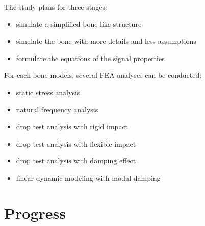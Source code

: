 \documentclass{sigchi}
\begin{document}
The study plans for three stages:
\begin{itemize}
\item simulate a simplified bone-like structure
\item simulate the bone with more details and less assumptions
\item formulate the equations of the signal properties
\newline
\end{itemize}

For each bone models, several FEA analyses can be conducted:
\begin{itemize}
\item static stress analysis
\item natural frequency analysis
\item drop test analysis with rigid impact
\item drop test analysis with flexible impact
\item drop test analysis with damping effect
\item linear dynamic modeling with modal damping 
\end{itemize}

\section{Progress} 
\end{document}
